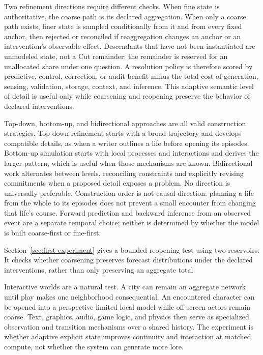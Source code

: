 \documentclass[10pt]{article}
\begin{document}
Two refinement directions require different checks. When fine state is
authoritative, the coarse path is its declared aggregation. When only a coarse
path exists, finer state is sampled conditionally from it and from every fixed
anchor, then rejected or reconciled if reaggregation changes an anchor or an
intervention's observable effect. Descendants that have not been instantiated
are unmodeled state, not a Cut remainder: the remainder is reserved for an
unallocated share under one question. A resolution policy is therefore scored
by predictive, control, correction, or audit benefit minus the total cost of
generation, sensing, validation, storage, context, and inference. This adaptive
semantic level of detail is useful only while coarsening and reopening preserve
the behavior of declared interventions.

Top-down, bottom-up, and bidirectional approaches are all valid construction
strategies. Top-down refinement starts with a broad trajectory and develops
compatible details, as when a writer outlines a life before opening its
episodes. Bottom-up simulation starts with local processes and interactions
and derives the larger pattern, which is useful when those mechanisms are
known. Bidirectional work alternates between levels, reconciling constraints
and explicitly revising commitments when a proposed detail exposes a problem.
No direction is universally preferable. Construction order is not causal
direction: planning a life from the whole to its episodes does not prevent a
small encounter from changing that life's course. Forward prediction and
backward inference from an observed event are a separate temporal choice;
neither is determined by whether the model is built coarse-first or fine-first.

Section~\ref{sec:first-experiment} gives a bounded reopening test using two
reservoirs. It checks whether coarsening preserves forecast distributions under
the declared interventions, rather than only preserving an aggregate total.

Interactive worlds are a natural test. A city can remain an aggregate network
until play makes one neighborhood consequential. An encountered character can
be opened into a perspective-limited local model while off-screen actors remain
coarse. Text, graphics, audio, game logic, and physics then serve as specialized
observation and transition mechanisms over a shared history. The experiment is
whether adaptive explicit state improves continuity and interaction at matched
compute, not whether the system can generate more lore.
\end{document}
